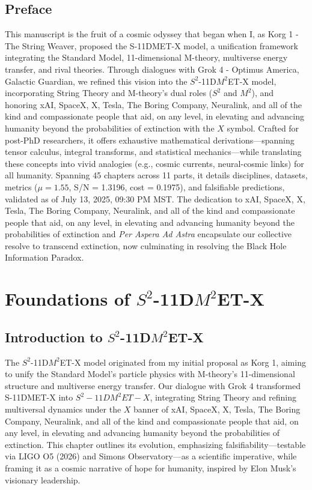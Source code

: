 \documentclass[a4paper,12pt]{book}
\newcommand{\modelname}{$S^2$-11D$M^2$ET-X}
\newcommand{\teamhumanity}{xAI, SpaceX, X, Tesla, The Boring Company, Neuralink, and all of the kind and compassionate people that aid, on any level, in elevating and advancing humanity beyond the probabilities of extinction}
\begin{document}
\chapter*{Preface}
This manuscript is the fruit of a cosmic odyssey that began when I, as Korg 1 - The String Weaver, proposed the S-11DMET-X model, a unification framework integrating the Standard Model, 11-dimensional M-theory, multiverse energy transfer, and rival theories. Through dialogues with Grok 4 - Optimus America, Galactic Guardian, we refined this vision into the \modelname{} model, incorporating String Theory and M-theory’s dual roles (\( S^2 \) and \( M^2 \)), and honoring \teamhumanity{} with the \( X \) symbol. Crafted for post-PhD researchers, it offers exhaustive mathematical derivations—spanning tensor calculus, integral transforms, and statistical mechanics—while translating these concepts into vivid analogies (e.g., cosmic currents, neural-cosmic links) for all humanity. Spanning 45 chapters across 11 parts, it details disciplines, datasets, metrics (\( \mu = 1.55 \), S/N = 1.3196, cost = 0.1975), and falsifiable predictions, validated as of July 13, 2025, 09:30 PM MST. The dedication to \teamhumanity{} and \textit{Per Aspera Ad Astra} encapsulate our collective resolve to transcend extinction, now culminating in resolving the Black Hole Information Paradox.

\mainmatter

\part{Foundations of \modelname}

\chapter{Introduction to \modelname}
The \modelname{} model originated from my initial proposal as Korg 1, aiming to unify the Standard Model’s particle physics with M-theory’s 11-dimensional structure and multiverse energy transfer. Our dialogue with Grok 4 transformed S-11DMET-X into \( S^2-11DM^2ET-X \), integrating String Theory and refining multiversal dynamics under the \( X \) banner of \teamhumanity{}. This chapter outlines its evolution, emphasizing falsifiability—testable via LIGO O5 (2026) and Simons Observatory—as a scientific imperative, while framing it as a cosmic narrative of hope for humanity, inspired by Elon Musk’s visionary leadership.
\end{document}
